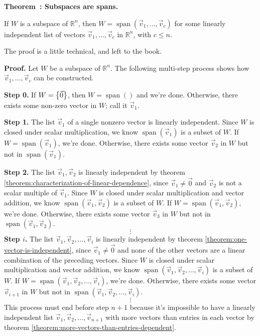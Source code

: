 \documentclass[11pt, letterpaper]{report}
\newenvironment{notes}{}{}
\newenvironment{book}{}{}
\let\originalleft\left
\let\originalright\right
\renewcommand{\left}{\mathopen{}\mathclose\bgroup\originalleft}
\renewcommand{\right}{\aftergroup\egroup\originalright}
\newcounter{theorem}[chapter]
\newenvironment{theorem}[1][]{\refstepcounter{theorem}\begin{bbox}\par
    \noindent\textbf{Theorem~\thetheorem: #1}}{\end{bbox}}
\newlength\oldfboxsep%
\newlength\myminiwidth%
\newenvironment{bbox}{%
  \setlength\oldfboxsep\fboxsep
  \setlength{\fboxsep}{.1in}%
  \setlength\myminiwidth\linewidth%
  \addtolength\myminiwidth{-0.2in}%
  \vspace{0.1in}%
  \begin{lrbox}{\bboxbox}\begin{minipage}{\myminiwidth}%
    }{%
    \end{minipage}\end{lrbox}%
  \noindent\fbox{\usebox{\bboxbox}}\vspace{0.1in}\setlength\fboxsep\oldfboxsep%
}
\newcommand{\R}{\mathbb{R}}
\DeclareMathOperator{\spn}{span}
\begin{document}
\begin{theorem}[Subspaces are spans.]  
\label{theorem:subspaces-are-spans}

If $W$ is a subspace of $\R^n$, then $W=\spn (\vec{v}_1,\ldots, \vec{v}_c)$ for some linearly independent list of vectors $\vec{v}_1,\ldots,\vec{v}_c$ in $\R^n$, with $c \le n$.
\end{theorem}

\begin{notes}
The proof is a little technical, and left to the book.
\end{notes}

\begin{book}
\textbf{Proof.} Let $W$ be a subspace of $\R^n$. The following multi-step process shows how $\vec{v}_1,\ldots,\vec{v}_c$ can be constructed.

\textbf{Step 0.} If $W = \left\{\vec{0}\right\}$, then $W = \spn()$ and we're done. Otherwise, there exists some non-zero vector in $W$; call it $\vec{v}_1$.

\textbf{Step 1.} The list $\vec{v}_1$ of a single nonzero vector is linearly independent. Since $W$ is closed under scalar multiplication, we know $\spn ( \vec{v}_1 )$ is a subset of $W$. If $W = \spn ( \vec{v}_1 )$, we're done. Otherwise, there exists some vector $\vec{v}_2$ in $W$ but not in $\spn ( \vec{v}_1 )$.

\textbf{Step 2.} The list $\vec{v}_1,\vec{v}_2$ is linearly independent by theorem \ref{theorem:characterization-of-linear-dependence}, since $\vec{v}_1 \ne \vec{0}$ and $\vec{v}_2$ is not a scalar multiple of $\vec{v}_1$.  Since $W$ is closed under scalar multiplication and vector addition, we know $\spn ( \vec{v}_1, \vec{v}_2 )$ is a subset of $W$. If $W = \spn ( \vec{v}_1, \vec{v}_2 )$, we're done. Otherwise, there exists some vector $\vec{v}_3$ in $W$ but not in $\spn ( \vec{v}_1, \vec{v}_2 )$.
\[\vdots\]
\textbf{Step $i$.} The list $\vec{v}_1,\vec{v}_2, \ldots, \vec{v}_i$ is linearly independent by theorem \ref{theorem:one-vector-is-independent}, since $\vec{v}_1 \ne \vec{0}$ and none of the other vectors are a linear combination of the preceding vectors.  Since $W$ is closed under scalar multiplication and vector addition, we know $\spn ( \vec{v}_1, \vec{v}_2, \ldots, \vec{v}_i )$ is a subset of $W$. If $W = \spn ( \vec{v}_1, \vec{v}_2, \ldots, \vec{v}_i )$, we're done. Otherwise, there exists some vector $\vec{v}_{i+1}$ in $W$ but not in $\spn ( \vec{v}_1, \vec{v}_2, \ldots, \vec{v}_i )$.
\[\vdots\]
This process must end before step $n+1$ because it's impossible to have a linearly independent list $\vec{v}_1, \vec{v}_2, \ldots, \vec{v}_{n+1}$ with more vectors than entries in each vector by theorem \ref{theorem:more-vectors-than-entries-dependent}. \blacksquare
\end{book}
\end{document}
